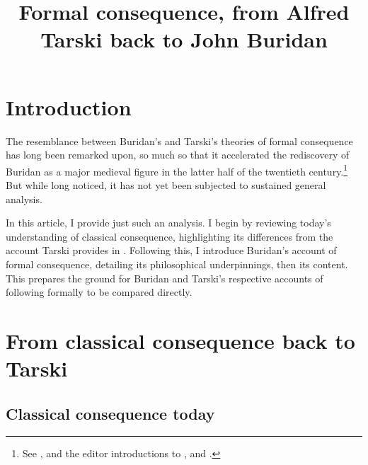 \documentclass[]{article}
\title{Formal consequence, from Alfred Tarski back to John Buridan}
\author{}
\begin{document}
\maketitle

\section{Introduction}
The resemblance between Buridan's and Tarski's theories of formal consequence has long been remarked upon, 
so much so that it accelerated the rediscovery of Buridan as a major medieval figure in the latter half of the twentieth century.\footnote{See \cite{Moody1952} \cite{Kneale1962} \cite{Dumitriu1974} \cite{DutilhNovaes2012a} \cite{DutilhNovaes2012c} \cite{Parsons2014}, and the editor introductions to \cite{BuridanTC}, \cite{Kretzmann1982} and \cite{King1985}.} 
But while long noticed, 
it has not yet been subjected to sustained general analysis.

In this article, 
I provide just such an analysis. 
I begin by reviewing today's understanding of classical consequence, 
highlighting its differences from the account Tarski provides in \cite{Tarski2002}. 
Following this, 
I introduce Buridan's account of formal consequence, 
detailing its philosophical underpinnings, 
then its content. 
This prepares the ground for Buridan and Tarski's respective accounts of following formally to be compared directly.
\section{From classical consequence back to Tarski}
\subsection{Classical consequence today}
\end{document}
